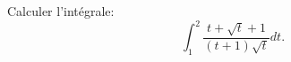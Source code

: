 Calculer l'int\'{e}grale: $${\int_{1}^{2}}
\frac{t+\sqrt{t}+1}{\left(  t+1\right)  \sqrt{t}}dt.$$ \bigskip